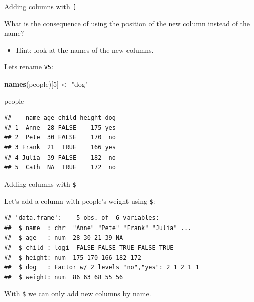 \documentclass[ignorenonframetext,]{beamer}
\newenvironment{Shaded}{\begin{snugshade}}{\end{snugshade}}
\newcommand{\DecValTok}[1]{\textcolor[rgb]{0.00,0.00,0.81}{#1}}
\newcommand{\KeywordTok}[1]{\textcolor[rgb]{0.13,0.29,0.53}{\textbf{#1}}}
\newcommand{\NormalTok}[1]{#1}
\newcommand{\OperatorTok}[1]{\textcolor[rgb]{0.81,0.36,0.00}{\textbf{#1}}}
\newcommand{\StringTok}[1]{\textcolor[rgb]{0.31,0.60,0.02}{#1}}
\providecommand{\tightlist}{%
  \setlength{\itemsep}{0pt}\setlength{\parskip}{0pt}}
\begin{document}
\begin{frame}[fragile]{Adding columns with \texttt{{[}}}
\protect\hypertarget{adding-columns-with-2}{}

What is the consequence of using the position of the new column instead
of the name?

\begin{itemize}
\tightlist
\item
  Hint: look at the names of the new columns.
\end{itemize}

Lets rename \texttt{V5}:

\begin{Shaded}
\begin{Highlighting}[]
\KeywordTok{names}\NormalTok{(people)[}\DecValTok{5}\NormalTok{] <-}\StringTok{ "dog"}

\NormalTok{people}
\end{Highlighting}
\end{Shaded}

\begin{verbatim}
##    name age child height dog
## 1  Anne  28 FALSE    175 yes
## 2  Pete  30 FALSE    170  no
## 3 Frank  21  TRUE    166 yes
## 4 Julia  39 FALSE    182  no
## 5  Cath  NA  TRUE    172  no
\end{verbatim}

\end{frame}

\begin{frame}[fragile]{Adding columns with \texttt{\$}}
\protect\hypertarget{adding-columns-with-3}{}

Let's add a column with people's weight using \texttt{\$}:

\begin{Shaded}
\end{Shaded}

\begin{verbatim}
## 'data.frame':    5 obs. of  6 variables:
##  $ name  : chr  "Anne" "Pete" "Frank" "Julia" ...
##  $ age   : num  28 30 21 39 NA
##  $ child : logi  FALSE FALSE TRUE FALSE TRUE
##  $ height: num  175 170 166 182 172
##  $ dog   : Factor w/ 2 levels "no","yes": 2 1 2 1 1
##  $ weight: num  86 63 68 55 56
\end{verbatim}

With \texttt{\$} we can only add new columns by name.

\end{frame}
\end{document}
